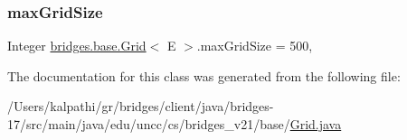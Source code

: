 \mbox{\label{classbridges_1_1base_1_1_grid_a39ff9a1d4fb83b5a2ee2d0031cea88e0}} 
\subsubsection{\texorpdfstring{max\+Grid\+Size}{maxGridSize}}
{\footnotesize\ttfamily Integer \mbox{\hyperlink{classbridges_1_1base_1_1_grid}{bridges.\+base.\+Grid}}$<$ E $>$.max\+Grid\+Size = 500\hspace{0.3cm}{\ttfamily [static]}, {\ttfamily [protected]}}



The documentation for this class was generated from the following file\+:\begin{DoxyCompactItemize}
\item 
/\+Users/kalpathi/gr/bridges/client/java/bridges-\/17/src/main/java/edu/uncc/cs/bridges\+\_\+v21/base/\mbox{\hyperlink{_grid_8java}{Grid.\+java}}\end{DoxyCompactItemize}
